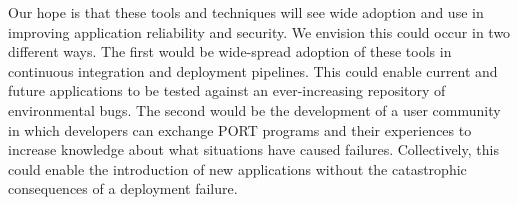 Our hope is that these tools and techniques will see wide
adoption and use in improving application reliability and security. We envision this could occur in two different ways. The first would be wide-spread adoption of these
tools in continuous
integration and deployment pipelines. This could enable current and future
applications to be tested against an ever-increasing repository of
environmental bugs.
The second would be the development of a user community in which developers can exchange PORT programs and their experiences to increase knowledge about what situations have caused failures.  Collectively, 
this could enable the introduction of new applications without the catastrophic consequences of a deployment failure. 

\vspace*{3ex plus 1fil}

